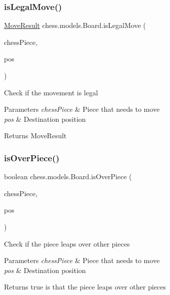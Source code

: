 \subsubsection{\texorpdfstring{is\+Legal\+Move()}{isLegalMove()}}
{\footnotesize\ttfamily \mbox{\hyperlink{enumchess_1_1models_1_1enums_1_1_move_result}{Move\+Result}} chess.\+models.\+Board.\+is\+Legal\+Move (\begin{DoxyParamCaption}\item[{\mbox{\hyperlink{classchess_1_1models_1_1_chess_piece}{Chess\+Piece}}}]{chess\+Piece,  }\item[{\mbox{\hyperlink{classchess_1_1models_1_1_position}{Position}}}]{pos }\end{DoxyParamCaption})}

Check if the movement is legal


\begin{DoxyParams}{Parameters}
{\em chess\+Piece} & Piece that needs to move \\
\hline
{\em pos} & Destination position \\
\hline
\end{DoxyParams}
\begin{DoxyReturn}{Returns}
Move\+Result 
\end{DoxyReturn}
\mbox{\label{classchess_1_1models_1_1_board_a8ffee6403d98b5e5e68c0a2b73440100}} 
\subsubsection{\texorpdfstring{is\+Over\+Piece()}{isOverPiece()}}
{\footnotesize\ttfamily boolean chess.\+models.\+Board.\+is\+Over\+Piece (\begin{DoxyParamCaption}\item[{\mbox{\hyperlink{classchess_1_1models_1_1_chess_piece}{Chess\+Piece}}}]{chess\+Piece,  }\item[{\mbox{\hyperlink{classchess_1_1models_1_1_position}{Position}}}]{pos }\end{DoxyParamCaption})}

Check if the piece leaps over other pieces


\begin{DoxyParams}{Parameters}
{\em chess\+Piece} & Piece that needs to move \\
\hline
{\em pos} & Destination position \\
\hline
\end{DoxyParams}
\begin{DoxyReturn}{Returns}
true is that the piece leaps over other pieces 
\end{DoxyReturn}
\mbox{\label{classchess_1_1models_1_1_board_a7e3f69e82d8337f3cf6109913e5335d3}} 
